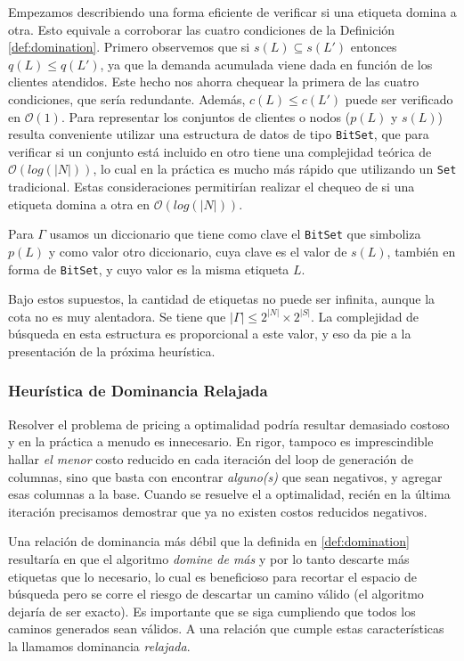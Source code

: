 Empezamos describiendo una forma eficiente de verificar si una etiqueta domina a otra. Esto equivale a corroborar las cuatro condiciones de la Definición \ref{def:domination}. Primero observemos que si $s(L) \subseteq s(L')$ entonces $q(L) \leq q(L')$, ya que la demanda acumulada viene dada en función de los clientes atendidos. Este hecho nos ahorra chequear la primera de las cuatro condiciones, que sería redundante. Además, $c(L) \leq c(L')$ puede ser verificado en $\mathcal{O}(1)$. Para representar los conjuntos de clientes o nodos ($p(L)$ y $s(L)$) resulta conveniente utilizar una estructura de datos de tipo \texttt{BitSet}, que para verificar si un conjunto está incluido en otro tiene una complejidad teórica de $\mathcal{O}(log(|N|))$, lo cual en la práctica es mucho más rápido que utilizando un \texttt{Set} tradicional. Estas consideraciones permitirían realizar el chequeo de si una etiqueta domina a otra en $\mathcal{O}(log(|N|))$.

Para $\Gamma$ usamos un diccionario que tiene como clave el \texttt{BitSet} que simboliza $p(L)$ y como valor otro diccionario, cuya clave es el valor de $s(L)$, también en forma de \texttt{BitSet}, y cuyo valor es la misma etiqueta $L$.

Bajo estos supuestos, la cantidad de etiquetas no puede ser infinita, aunque la cota no es muy alentadora. Se tiene que $|\Gamma| \leq 2^{|N|} \times 2^{|S|}$. La complejidad de búsqueda en esta estructura es proporcional a este valor, y eso da pie a la presentación de la próxima heurística.


\subsubsection{Heurística de Dominancia Relajada}
\label{subsubsection:segment-tree-heuristic}

Resolver el problema de pricing a optimalidad podría resultar demasiado costoso y en la práctica a menudo es innecesario. En rigor, tampoco es imprescindible hallar \emph{el menor} costo reducido en cada iteración del loop de generación de columnas, sino que basta con encontrar \emph{alguno(s)} que sean negativos, y agregar esas columnas a la base. Cuando se resuelve el  a optimalidad, recién en la última iteración precisamos demostrar que ya no existen costos reducidos negativos. 

Una relación de dominancia más débil que la definida en \ref{def:domination} resultaría en que el algoritmo \emph{domine de más} y por lo tanto descarte más etiquetas que lo necesario, lo cual es beneficioso para recortar el espacio de búsqueda pero se corre el riesgo de descartar un camino válido (el algoritmo dejaría de ser exacto). Es importante que se siga cumpliendo que todos los caminos generados sean válidos. A una relación que cumple estas características la llamamos dominancia \emph{relajada}.

